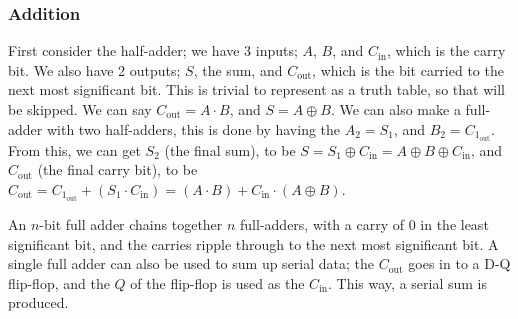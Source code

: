 \documentclass[a4paper, 12pt]{article}
\begin{document}
            \subsubsection*{Addition}
                First consider the half-adder; we have 3 inputs; $A$, $B$, and $C_\text{in}$, which is the carry bit. We also have 2 outputs; $S$, the sum, and $C_\text{out}$, which is the bit carried to the next most significant bit. This is trivial to represent as a truth table, so that will be skipped. We can say $C_\text{out} = A \cdot B$, and $S = A \oplus B$. We can also make a full-adder with two half-adders, this is done by having the $A_2 = S_1$, and $B_2 = C_{1_\text{out}}$. From this, we can get $S_2$ (the final sum), to be $S = S_1 \oplus C_\text{in} = A \oplus B \oplus C_\text{in}$, and $C_\text{out}$ (the final carry bit), to be $C_\text{out} = C_{1_\text{out}} + (S_1 \cdot C_\text{in}) = (A \cdot B) + C_\text{in} \cdot (A \oplus B)$.
                \medskip

                An $n$-bit full adder chains together $n$ full-adders, with a carry of 0 in the least significant bit, and the carries ripple through to the next most significant bit. A single full adder can also be used to sum up serial data; the $C_\text{out}$ goes in to a D-Q flip-flop, and the $Q$ of the flip-flop is used as the $C_\text{in}$. This way, a serial sum is produced.
\end{document}

